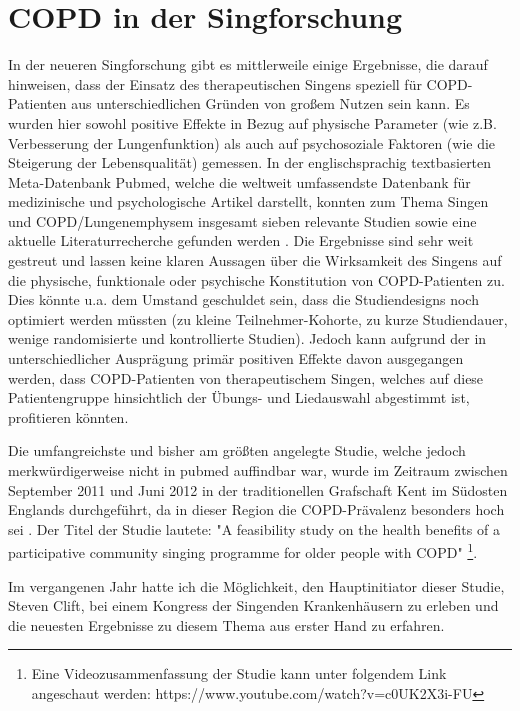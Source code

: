 \section{COPD in der Singforschung}
\label{copd_in_der_singforschung}
In der neueren Singforschung gibt es mittlerweile einige Ergebnisse, die darauf hinweisen, dass der Einsatz des therapeutischen Singens speziell für COPD-Patienten aus unterschiedlichen Gründen von großem Nutzen sein kann. Es wurden hier sowohl positive Effekte in Bezug auf physische Parameter (wie z.B. Verbesserung der Lungenfunktion) als auch auf psychosoziale Faktoren (wie die Steigerung der Lebensqualität) gemessen.
In der englischsprachig textbasierten Meta-Datenbank Pubmed, welche die weltweit umfassendste Datenbank für medizinische und psychologische Artikel darstellt, konnten zum Thema Singen und COPD/Lungenemphysem insgesamt sieben relevante Studien sowie eine aktuelle Literaturrecherche gefunden werden \autocite{pmid19436683,pmid20175359,pmid20682030,pmid23145504,pmid23497924,pmid23497929,pmid24398814,pmid24793633}. Die Ergebnisse sind sehr weit gestreut und lassen keine klaren Aussagen über die Wirksamkeit des Singens auf die physische, funktionale oder psychische Konstitution von COPD-Patienten zu. Dies könnte u.a. dem Umstand geschuldet sein, dass die Studiendesigns noch optimiert werden müssten (zu kleine Teilnehmer-Kohorte, zu kurze Studiendauer, wenige randomisierte und kontrollierte Studien). Jedoch kann aufgrund der in unterschiedlicher Ausprägung primär positiven Effekte davon ausgegangen werden, dass COPD-Patienten von therapeutischem Singen, welches auf diese Patientengruppe hinsichtlich der Übungs- und Liedauswahl abgestimmt ist, profitieren könnten.

Die umfangreichste und bisher am größten angelegte Studie, welche jedoch merkwürdigerweise nicht in pubmed auffindbar war, wurde im Zeitraum zwischen September 2011 und Juni 2012 in der traditionellen Grafschaft Kent im Südosten Englands durchgeführt, da in dieser Region die COPD-Prävalenz besonders hoch sei \autocite[vgl.][4]{clift2013}. Der Titel der Studie lautete: "A feasibility study on the health benefits of a participative community singing programme for older people with COPD" \footnote{Eine Videozusammenfassung der Studie kann unter folgendem Link angeschaut werden: https://www.youtube.com/watch?v=c0UK2X3i-FU}.

Im vergangenen Jahr hatte ich die Möglichkeit, den Hauptinitiator dieser Studie, Steven Clift, bei einem Kongress der Singenden Krankenhäusern zu erleben und die neuesten Ergebnisse zu diesem Thema aus erster Hand zu erfahren. 

